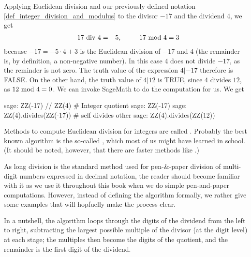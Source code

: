 \begin{example} Applying Euclidean division and our previously defined notation \ref{def_integer_division_and_modulus} to the divisor $-17$ and the dividend $4$, we get 
\begin{equation*}
\begin{array}{lcr}
-17 \text{ div } 4 = - 5, & & -17 \text{ mod } 4 = 3
\end{array}
\end{equation*}
because $ -17 = -5 \cdot 4 + 3 $  is the Euclidean division of $-17$ and $4$ (the remainder is, by definition, a non-negative number). In this case $4$ does not divide $-17$, as the reminder is not zero. The truth value of the expression $4 | -17 $ therefore is FALSE. On the other hand, the truth value of $4 | 12$ is TRUE, since $4$ divides $12$, as $ 12 \text{ mod } 4 = 0 $. We can invoke SageMath to do the computation for us. We get
\begin{sagecommandline}
sage: ZZ(-17) // ZZ(4) # Integer quotient 
sage: ZZ(-17) %
sage: ZZ(4).divides(ZZ(-17)) # self divides other
sage: ZZ(4).divides(ZZ(12))
\end{sagecommandline}
\end{example}
Methods to compute Euclidean division for integers are called . Probably the best known algorithm is the so-called , which most of us might have learned in school. (It should be noted, however, that there are faster methods like .)

As long division is the standard method used for pen-\&-paper division of multi-digit numbers expressed in decimal notation, the reader should become familiar with it as we use it throughout this book when we do simple pen-and-paper computations. However, instead of defining the algorithm formally, we rather give some examples that will hopfuelly  make the process clear.

In a nutshell, the algorithm loops through the digits of the dividend from the left to right, subtracting the largest possible multiple of the divisor (at the digit level) at each stage; the multiples then become the digits of the quotient, and the remainder is the first digit of the dividend. 

